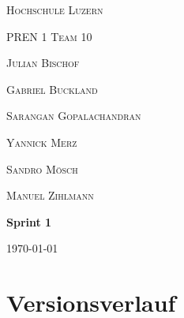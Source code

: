 \documentclass{scrarticle}                %
\newcommand{\Abgabenummer}{1}
\begin{document}

\begin{titlepage}
	\centering
	{\scshape\LARGE Hochschule Luzern \par}
	\vspace{1cm}
	{\scshape\Large PREN 1 Team 10\par}
	\vspace{1cm}

	{\scshape\large Julian Bischof\par}
	{\scshape\large Gabriel Buckland\par}
	{\scshape\large Sarangan Gopalachandran \par}
	{\scshape\large Yannick Merz\par}
	{\scshape\large Sandro Mösch\par}
	{\scshape\large Manuel Zihlmann\par}

	\vspace{1.5cm}
	{\huge\bfseries Sprint \Abgabenummer \par}

	\vspace{1cm}


	\vfill
	{\large \today\par}
\end{titlepage}

\newpage


\section*{Versionsverlauf}
\thispagestyle{nofooter}
\end{document}
